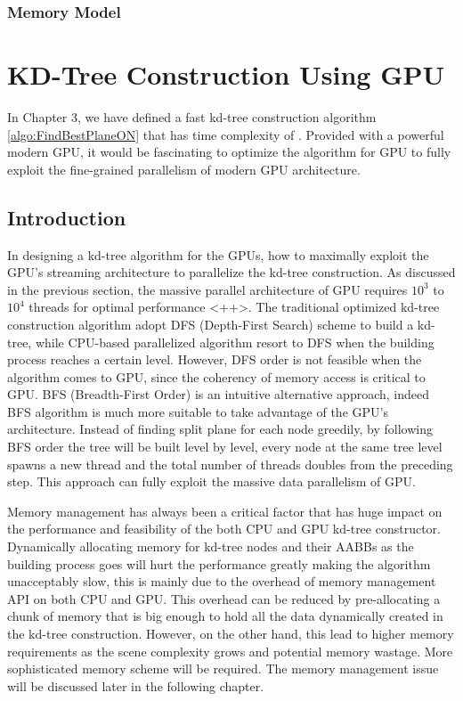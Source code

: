 \subsubsection{Memory Model}










\section{KD-Tree Construction Using GPU}
In Chapter 3, we have defined a fast kd-tree construction algorithm \ref{algo:FindBestPlaneON} that has time complexity of \mycomplexitynlogn. Provided with a powerful modern GPU, it would be fascinating to optimize the algorithm for GPU to fully exploit the fine-grained parallelism of modern GPU architecture. 


\subsection{Introduction}

In designing a kd-tree algorithm for the GPUs, how to maximally exploit the GPU's streaming architecture to parallelize the kd-tree construction. As discussed in the previous section, the massive parallel architecture of GPU requires \(10^{3}\) to \(10^{4}\) threads for optimal performance \cite{}<++>. The traditional optimized kd-tree construction algorithm adopt DFS (Depth-First Search) scheme to build a kd-tree, while CPU-based parallelized algorithm resort to DFS when the building process reaches a certain level. However, DFS order is not feasible when the algorithm comes to GPU, since the coherency of memory access is critical to GPU. BFS (Breadth-First Order) is an intuitive alternative approach, indeed BFS algorithm is much more suitable to take advantage of the GPU's architecture. Instead of finding split plane for each node greedily, by following BFS order the tree will be built level by level, every node at the same tree level spawns a new thread and the total number of threads doubles from the preceding step. This approach can fully exploit the massive data parallelism of GPU.

Memory management has always been a critical factor that has huge impact on the performance and feasibility of the both CPU and GPU kd-tree constructor. Dynamically allocating memory for kd-tree nodes and their AABBs as the building process goes will hurt the performance greatly making the algorithm unacceptably slow, this is mainly due to the overhead of memory management API on both CPU and GPU. This overhead can be reduced by pre-allocating a chunk of memory that is big enough to hold all the data dynamically created in the kd-tree construction. However, on the other hand, this lead to higher memory requirements as the scene complexity grows and potential memory wastage. More sophisticated memory scheme will be required. The memory management issue will be discussed later in the following chapter.


